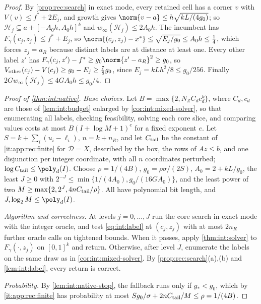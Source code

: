 \begin{proof}
By \cref{prop:rec:search} in exact mode, every retained cell has a corner $v$
with $V(v)\le f^*+2E_j$, and growth gives $\norm{v-a}\le h\sqrt{kL/(4g_0)}$; so
$\mathcal H_j\subseteq a+[-A_0h,A_0h]^k$ and $w_\infty(\mathcal H_j)\le2A_0h$. The
incumbent has $F_\gamma(c_j,z_j)\le f^*+E_j$, so
$\norm{(c_j,z_j)-x^*}\le\sqrt{E_j/g_0}\le A_0h\le\frac14$, which forces
$z_j=a_R$ because distinct labels are at distance at least one. Every other
label $z'$ has $F_\gamma(c_j,z')-f^*\ge g_0\norm{z'-a_R}^2\ge g_0$, so
$V_{\rm other}(c_j)-V(c_j)\ge g_0-E_j\ge\frac78g_0$, since
$E_j=kLh^2/8\le g_0/256$. Finally $2Gw_\infty(\mathcal H_j)\le4GA_0h\le g_0/4$.
\end{proof}

\begin{proof}[Proof of \cref{thm:int:native}]
\emph{Base choices.} Let $B=\max\{2,N_ZC_dc_d^k\}$, where $C_d,c_d$ are those of
\cref{lem:int:budget} enlarged by \cref{cor:int:mixed-solver}, so that enumerating
all labels, checking feasibility, solving each core slice, and comparing values
costs at most $B(I+\log M+1)^{e}$ for a fixed exponent $e$. Let
$S=k+\sum_i(u_i-\ell_i)$, $n=k+n_R$, and let $C_{\rm tail}$ be the constant of
\ref{it:app:rec:finite} for $\mathcal D=X$, described by the box, the rows of
$Az\le b$, and one disjunction per integer coordinate, with all $n$ coordinates
perturbed; $\log C_{\rm tail}\le\poly_d(I)$. Choose $\rho=1/(4B)$,
$g_0=\rho\sigma/(2S)$, $A_0=2+kL/g_0$, the least $J\ge0$ with
$2^{-J}\le\min\{1/(4A_0),g_0/(16GA_0)\}$, and the least power of two
$M\ge\max\{2,2^J,4nC_{\rm tail}/\rho\}$. All have polynomial bit length, and
$J,\log_2M\le\poly_d(I)$.

\emph{Algorithm and correctness.} At levels $j=0,\ldots,J$ run the core search in
exact mode with the integer oracle, and test \eqref{eq:int:label} at
$(c_j,z_j)$ with at most $2n_R$ further oracle calls on tightened bounds. When it
passes, apply \cref{thm:int:solver} to $F_\gamma(\cdot,z_j)$ on $[0,1]^k$ and
return. Otherwise, after level $J$, enumerate the labels on the same draw as in
\cref{cor:int:mixed-solver}. By \cref{prop:rec:search}(a),(b) and
\cref{lem:int:label}, every return is correct.

\emph{Probability.} By \cref{lem:int:native-stop}, the fallback runs only if
$g_*<g_0$, which by \ref{it:app:rec:finite} has probability at most
$Sg_0/\sigma+2nC_{\rm tail}/M\le\rho=1/(4B)$.


\end{proof}
